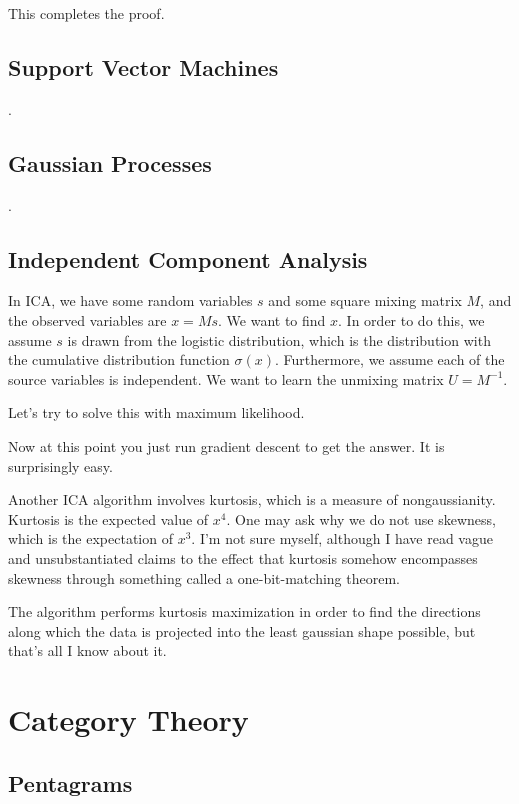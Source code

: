 \documentclass[12pt]{article}
\begin{document}
This completes the proof.

\subsection{Support Vector Machines}
.
\subsection{Gaussian Processes}
.
\subsection{Independent Component Analysis}

In ICA, we have some random variables $s$ and some square mixing matrix $M$, and the observed variables are $x = Ms$. We want to find $x$. In order to do this, we assume $s$ is drawn from the logistic distribution, which is the distribution with the cumulative distribution function $\sigma(x)$. Furthermore, we assume each of the source variables is independent. We want to learn the unmixing matrix $U = M^{-1}$. 

Let's try to solve this with maximum likelihood.


Now at this point you just run gradient descent to get the answer. It is surprisingly easy.

Another ICA algorithm involves kurtosis, which is a measure of nongaussianity. Kurtosis is the expected value of $x^4$. One may ask why we do not use skewness, which is the expectation of $x^3$. I'm not sure myself, although I have read vague and unsubstantiated claims to the effect that kurtosis somehow encompasses skewness through something called a one-bit-matching theorem.

The algorithm performs kurtosis maximization in order to find the directions along which the data is projected into the least gaussian shape possible, but that's all I know about it.

\section{Category Theory}

\subsection{Pentagrams}
\end{document}
